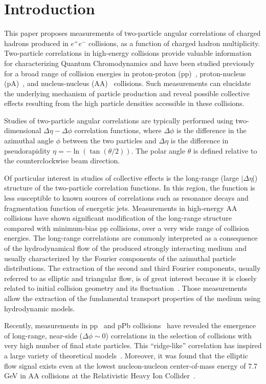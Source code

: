 \section{Introduction}

This paper proposes measurements of two-particle angular correlations of charged hadrons produced in $e^+e^-$ collisions, as a function of charged hadron multiplicity. Two-particle correlations in high-energy collisions provide valuable information for characterizing Quantum Chromodynamics and have been studied previously for a broad range of collision energies in proton-proton (pp)~\cite{Khachatryan:2010gv}, proton-nucleus (pA)~\cite{CMS:2012qk,Abelev:2012ola,Aad:2012gla}, and nucleus-nucleus (AA)~\cite{Aamodt:2010pa,Chatrchyan:2012wg} collisions. Such measurements can elucidate the underlying mechanism of particle production and reveal possible collective effects resulting from the high particle densities accessible in these collisions.

Studies of two-particle angular correlations are typically performed using two-dimensional $\Delta\eta-\Delta\phi$ correlation functions, where $\Delta\phi$ is the difference in the azimuthal angle $\phi$ between the two particles and $\Delta\eta$ is the difference in pseudorapidity $\eta = -\ln(\tan(\theta/2))$. The polar angle $\theta$ is defined relative to the counterclockwise beam direction.

Of particular interest in studies of collective effects is the long-range (large $|\Delta\eta|$) structure of the two-particle correlation functions. In this region, the function is less susceptible to known sources of correlations such as resonance decays and fragmentation function of energetic jets. Measurements in high-energy AA collisions have shown significant modification of the long-range structure compared with minimum-bias pp collisions, over a very wide range of collision energies. The long-range correlations are commonly interpreted as a consequence of the hydrodynamical flow of the produced strongly interacting medium and usually characterized by the Fourier components of the azimuthal particle distributions. The extraction of the second and third Fourier components, usually referred to as elliptic and triangular flow, is of great interest because it is closely related to initial collision geometry and its fluctuation~\cite{Alver:2010gr}. Those measurements allow the extraction of the fundamental transport properties of the medium using hydrodynamic models.

Recently, measurements in pp~\cite{Khachatryan:2010gv} and pPb collisions~\cite{CMS:2012qk,Abelev:2012ola,Aad:2012gla} have revealed the emergence of long-range, near-side ($\Delta\phi\sim 0$) correlations in the selection of collisions with very high number of final state particles. This ``ridge-like'' correlation has inspired a large variety of theoretical models~\cite{Bzdak:2013zma,Dusling:2015gta}. Moreover, it was found that the elliptic flow signal exists even at the lowest nucleon-nucleon center-of-mass energy of 7.7 GeV in AA collisions at the Relativistic Heavy Ion Collider~\cite{Adamczyk:2012ku}. 

